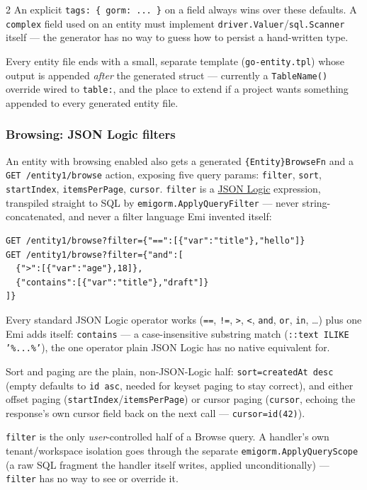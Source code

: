 \begin{multicols}{2}
\raggedcolumns
{}
An explicit \texttt{tags: \{ gorm: ... \}} on a field always wins over
these defaults. A \texttt{complex} field used on an entity must implement
\texttt{driver.Valuer}/\texttt{sql.Scanner} itself --- the generator has
no way to guess how to persist a hand-written type.

Every entity file ends with a small, separate template
(\texttt{go-entity.tpl}) whose output is appended \emph{after} the
generated struct --- currently a \texttt{TableName()} override wired to
\texttt{table:}, and the place to extend if a project wants something
appended to every generated entity file.

\subsubsection{Browsing: JSON Logic filters}
An entity with browsing enabled also gets a generated
\texttt{\{Entity\}BrowseFn} and a \texttt{GET /entity1/browse} action,
exposing five query params: \texttt{filter}, \texttt{sort},
\texttt{startIndex}, \texttt{itemsPerPage}, \texttt{cursor}.
\texttt{filter} is a \href{https://jsonlogic.com}{JSON Logic} expression,
transpiled straight to SQL by \texttt{emigorm.ApplyQueryFilter} --- never
string-concatenated, and never a filter language Emi invented itself:
\begin{lstlisting}
GET /entity1/browse?filter={"==":[{"var":"title"},"hello"]}
GET /entity1/browse?filter={"and":[
  {">":[{"var":"age"},18]},
  {"contains":[{"var":"title"},"draft"]}
]}
\end{lstlisting}
Every standard JSON Logic operator works (\texttt{==}, \texttt{!=},
\texttt{>}, \texttt{<}, \texttt{and}, \texttt{or}, \texttt{in}, \ldots)
plus one Emi adds itself: \texttt{contains} --- a case-insensitive
substring match (\texttt{::text ILIKE '\%...\%'}), the one operator
plain JSON Logic has no native equivalent for.

Sort and paging are the plain, non-JSON-Logic half:
\texttt{sort=createdAt desc} (empty defaults to \texttt{id asc}, needed
for keyset paging to stay correct), and either offset paging
(\texttt{startIndex}/\texttt{itemsPerPage}) or cursor paging
(\texttt{cursor}, echoing the response's own cursor field back on the
next call --- \texttt{cursor=id(42)}).

\begin{pullquote}
\texttt{filter} is the only \emph{user}-controlled half of a Browse
query. A handler's own tenant/workspace isolation goes through the
separate \texttt{emigorm.ApplyQueryScope} (a raw SQL fragment the
handler itself writes, applied unconditionally) --- \texttt{filter} has
no way to see or override it.
\end{pullquote}


\end{multicols}
